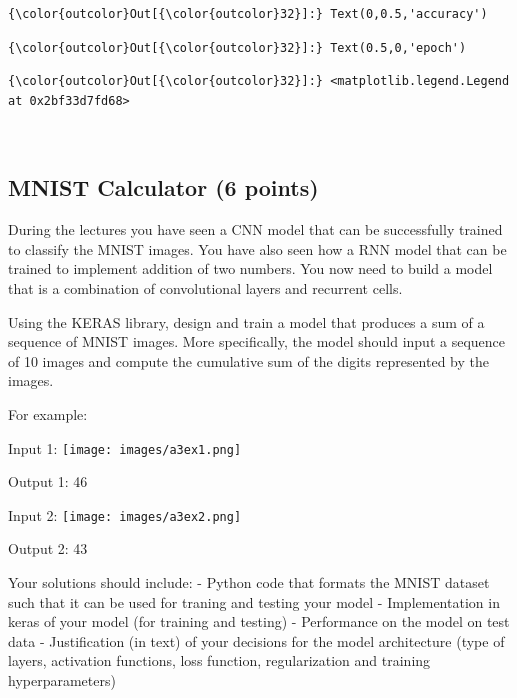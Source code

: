 \documentclass[11pt]{article}
\begin{document}
\begin{Verbatim}[commandchars=\\\{\}]
{\color{outcolor}Out[{\color{outcolor}32}]:} Text(0,0.5,'accuracy')
\end{Verbatim}
            
\begin{Verbatim}[commandchars=\\\{\}]
{\color{outcolor}Out[{\color{outcolor}32}]:} Text(0.5,0,'epoch')
\end{Verbatim}
            
\begin{Verbatim}[commandchars=\\\{\}]
{\color{outcolor}Out[{\color{outcolor}32}]:} <matplotlib.legend.Legend at 0x2bf33d7fd68>
\end{Verbatim}
            
    \begin{center}
    \end{center}
    { \hspace*{\fill} \\}
    
    \subsection{MNIST Calculator (6
points)}\label{mnist-calculator-6-points}

During the lectures you have seen a CNN model that can be successfully
trained to classify the MNIST images. You have also seen how a RNN model
that can be trained to implement addition of two numbers. You now need
to build a model that is a combination of convolutional layers and
recurrent cells.

Using the KERAS library, design and train a model that produces a sum of
a sequence of MNIST images. More specifically, the model should input a
sequence of 10 images and compute the cumulative sum of the digits
represented by the images.

For example:

Input 1: \texttt{[image: images/a3ex1.png]}

Output 1: 46

Input 2: \texttt{[image: images/a3ex2.png]}

Output 2: 43

Your solutions should include: - Python code that formats the MNIST
dataset such that it can be used for traning and testing your model -
Implementation in keras of your model (for training and testing) -
Performance on the model on test data - Justification (in text) of your
decisions for the model architecture (type of layers, activation
functions, loss function, regularization and training hyperparameters)
\end{document}
